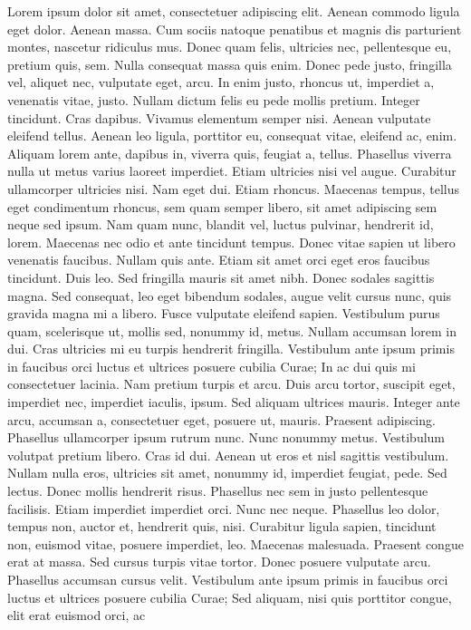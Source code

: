 \documentclass[a4paper,12pt]{report}
\begin{document}
Lorem ipsum dolor sit amet, consectetuer adipiscing elit. Aenean
commodo ligula eget dolor. Aenean massa. Cum sociis natoque
penatibus et magnis dis parturient montes, nascetur ridiculus mus.
Donec quam felis, ultricies nec, pellentesque eu, pretium quis, sem.
Nulla consequat massa quis enim. Donec pede justo, fringilla vel,
aliquet nec, vulputate eget, arcu. In enim justo, rhoncus ut,
imperdiet a, venenatis vitae, justo. Nullam dictum felis eu pede
mollis pretium. Integer tincidunt. Cras dapibus. Vivamus elementum
semper nisi. Aenean vulputate eleifend tellus. Aenean leo ligula,
porttitor eu, consequat vitae, eleifend ac, enim. Aliquam lorem
ante, dapibus in, viverra quis, feugiat a, tellus. Phasellus viverra
nulla ut metus varius laoreet %
imperdiet. Etiam ultricies nisi vel augue. Curabitur ullamcorper
ultricies nisi. Nam eget dui. Etiam rhoncus. Maecenas tempus, tellus
eget condimentum rhoncus, sem quam semper libero, sit amet
adipiscing sem neque sed ipsum. Nam quam nunc, blandit vel, luctus
pulvinar, hendrerit id, lorem. Maecenas nec odio et ante tincidunt
tempus. Donec vitae sapien ut libero venenatis faucibus. Nullam quis
ante. Etiam sit amet orci eget eros faucibus tincidunt. Duis leo.
Sed fringilla mauris sit amet nibh. Donec sodales sagittis magna.
Sed consequat, leo eget bibendum sodales, augue velit cursus nunc,
quis gravida magna mi a libero. Fusce vulputate eleifend sapien.
Vestibulum purus quam, scelerisque ut, mollis sed, nonummy id,
metus. Nullam accumsan lorem in dui. Cras ultricies mi eu turpis
hendrerit fringilla. Vestibulum ante ipsum primis in faucibus orci
luctus et ultrices posuere cubilia Curae; In ac dui quis mi
consectetuer lacinia. Nam pretium turpis et arcu. Duis arcu tortor,
suscipit eget, imperdiet nec, imperdiet iaculis, ipsum. Sed aliquam
ultrices mauris. Integer ante arcu, accumsan a, consectetuer eget,
posuere ut, mauris. Praesent adipiscing. Phasellus ullamcorper ipsum
rutrum nunc. Nunc nonummy metus. Vestibulum volutpat pretium libero.
Cras id dui. Aenean ut eros et nisl sagittis vestibulum. Nullam
nulla eros, ultricies sit amet, nonummy id, imperdiet feugiat, pede.
Sed lectus. Donec mollis hendrerit risus. Phasellus nec sem in justo
pellentesque facilisis. Etiam imperdiet imperdiet orci. Nunc nec
neque. Phasellus leo dolor, tempus non, auctor et, hendrerit quis,
nisi. Curabitur ligula sapien, tincidunt non, euismod vitae, posuere
imperdiet, leo. Maecenas malesuada. Praesent congue erat at massa.
Sed cursus turpis vitae tortor. Donec posuere vulputate arcu.
Phasellus accumsan cursus velit. Vestibulum ante ipsum primis in
faucibus orci luctus et ultrices posuere cubilia Curae; Sed aliquam,
nisi quis porttitor congue, elit erat euismod orci, ac \cite{vassiliadis2000}
\end{document}
